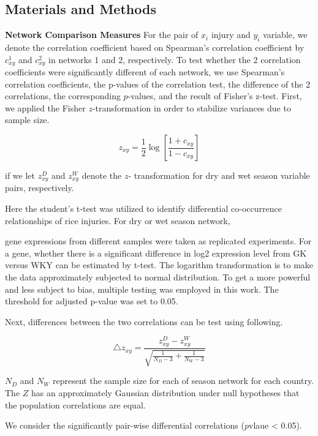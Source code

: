 \subsection{Materials and Methods}

\textbf{Network Comparison Measures}
For the pair of $x_{i}$ injury and $y_{i}$ variable, we denote the correlation coefficient based on Spearman's correlation coefficient by $c_{xy}^1$ and $c_{xy}^2$ in networks 1 and 2, respectively. To test whether the 2 correlation coefficients were significantly different of each network, we use Spearman's correlation coefficients, the p-values of the correlation test, the difference of the 2 correlations, the corresponding $p$-values, and the result of Fisher's z-test. First, we applied the Fisher $z$-transformation in order to stabilize variances due to sample size.

\begin{equation}
z_{xy} = \frac{1}{2} \log\left[{\frac{1 + c_{xy}}{1 - c_{xy}}}\right]
\end{equation}

if we let $z_{xy}^D $ and $z_{xy}^W$ denote the $z$- transformation for dry and wet season variable pairs, respectively. 

Here the student's t-test was utilized to identify differential co-occurrence relationships of rice injuries. For dry or wet season network, 

gene expressions from different samples were taken as replicated experiments. For a gene, whether there is a significant difference in log2 expression level from GK versus WKY can be estimated by t-test. The logarithm transformation is to make the data approximately subjected to normal distribution. To get a more powerful and less subject to bias, multiple testing was employed in this work. The threshold for adjusted p-value was set to 0.05.

Next, differences between the two correlations can be test using following. 

\begin{equation}
\triangle z_{xy} = \frac{z_{xy}^D - z_{xy}^W}{\sqrt{\frac{1}{N_{D}-3}+ \frac{1}{N_{W}-3}}}
\end{equation}

$N_{D}$ and $N_{W}$ represent the sample size for each of season network for each country. The $Z$ has an approximately Gaussian distribution under null hypotheses that the population correlations are equal.

We consider the significantly pair-wise differential correlations ($p$vlaue < 0.05).


 

